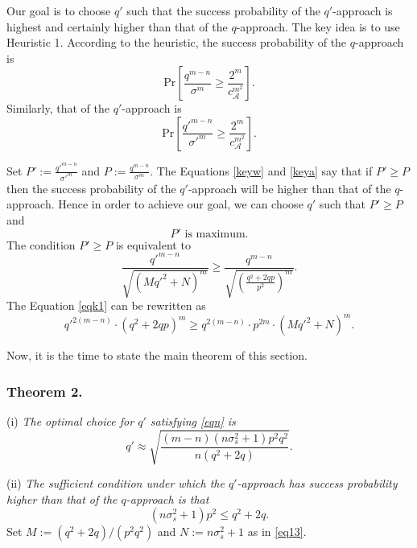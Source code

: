\documentclass[runningheads]{llncs}
\begin{document}
Our goal is to choose $q'$ such that the success probability of  the $q'$-approach is highest and certainly higher than that of the $q$-approach. The key idea is to use Heuristic 1. According to the heuristic, the success probability of the $q$-approach is
\begin{equation}\label{keyw}
\mathrm{Pr} \left[\frac{q^{m-n}}{\sigma^m} \geq  \frac{2^m}{c_{\mathcal{A}}^{m^2}}\right].
\end{equation}
Similarly, that of the $q'$-approach is
\begin{equation}\label{keya}
\mathrm{Pr} \left[\frac{q'^{m-n}}{\sigma'^m} \geq  \frac{2^m}{c_{\mathcal{A}}^{m^2}}\right].
\end{equation}

Set $P':=\frac{ q'^{m-n}}{ \sigma'^m} $ and $ P:= \frac{ q^{m-n}}{ \sigma^m}$. The Equations \eqref{keyw} and \eqref{keya} say that if $P' \geq P$ then the success probability of the $q'$-approach will be higher than that of the $q$-approach. Hence in order to achieve our goal, we can choose $q'$ such that $P' \geq P$ and
 \begin{equation}\label{eqn}
P' \text{ is maximum}.
\end{equation} 
The condition $P' \geq P$ is equivalent to
\begin{equation}\label{eqk1}
\frac{q'^{m-n}}{\sqrt{(Mq'^2+N)^m}} \geq \frac{q^{m-n}}{\sqrt{(\frac{q^2+2qp}{p^2})^m}}.
\end{equation}
The Equation \eqref{eqk1} can be rewritten as  
\begin{equation}\label{eqk2}
q'^{2(m-n)} \cdot (q^2+2qp)^m \geq q^{2(m-n)} \cdot p^{2m} \cdot (Mq'^2+N)^m.
\end{equation}

Now, it is the time to state the main theorem of this section.
\subsubsection{Theorem 2.} \label{theorem3} 
(i) \textit{The optimal choice for $q'$ satisfying \eqref{eqn} is}
\begin{equation} \label{eq26}
q' \approx \sqrt{\frac{(m-n)(n\sigma_s^2+1)p^2q^2}{n(q^2+2q)}}.
\end{equation}

(ii) \textit{The sufficient condition under which the $q'$-approach has success probability higher than that of the $q$-approach is that 
	\begin{equation}\label{key6}
	(n\sigma_s^2+1)p^2 \leq q^2+2q.
	\end{equation}}
\proof Set $M:=(q^2+2q)/(p^2q^2)$ and $N:=n\sigma_s^2+1$ as in \eqref{eq13}.
\end{document}
